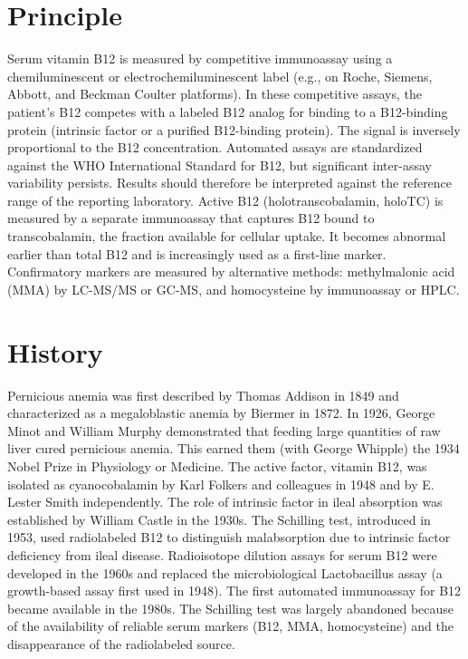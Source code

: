 \section*{Principle}
Serum vitamin B12 is measured by competitive immunoassay using a chemiluminescent or electrochemiluminescent label (e.g., on Roche, Siemens, Abbott, and Beckman Coulter platforms). In these competitive assays, the patient's B12 competes with a labeled B12 analog for binding to a B12-binding protein (intrinsic factor or a purified B12-binding protein). The signal is inversely proportional to the B12 concentration. Automated assays are standardized against the WHO International Standard for B12, but significant inter-assay variability persists. Results should therefore be interpreted against the reference range of the reporting laboratory. Active B12 (holotranscobalamin, holoTC) is measured by a separate immunoassay that captures B12 bound to transcobalamin, the fraction available for cellular uptake. It becomes abnormal earlier than total B12 and is increasingly used as a first-line marker. Confirmatory markers are measured by alternative methods: methylmalonic acid (MMA) by LC-MS/MS or GC-MS, and homocysteine by immunoassay or HPLC.

\section*{History}
Pernicious anemia was first described by Thomas Addison in 1849 and characterized as a megaloblastic anemia by Biermer in 1872. In 1926, George Minot and William Murphy demonstrated that feeding large quantities of raw liver cured pernicious anemia. This earned them (with George Whipple) the 1934 Nobel Prize in Physiology or Medicine. The active factor, vitamin B12, was isolated as cyanocobalamin by Karl Folkers and colleagues in 1948 and by E. Lester Smith independently. The role of intrinsic factor in ileal absorption was established by William Castle in the 1930s. The Schilling test, introduced in 1953, used radiolabeled B12 to distinguish malabsorption due to intrinsic factor deficiency from ileal disease. Radioisotope dilution assays for serum B12 were developed in the 1960s and replaced the microbiological Lactobacillus assay (a growth-based assay first used in 1948). The first automated immunoassay for B12 became available in the 1980s. The Schilling test was largely abandoned because of the availability of reliable serum markers (B12, MMA, homocysteine) and the disappearance of the radiolabeled source.

